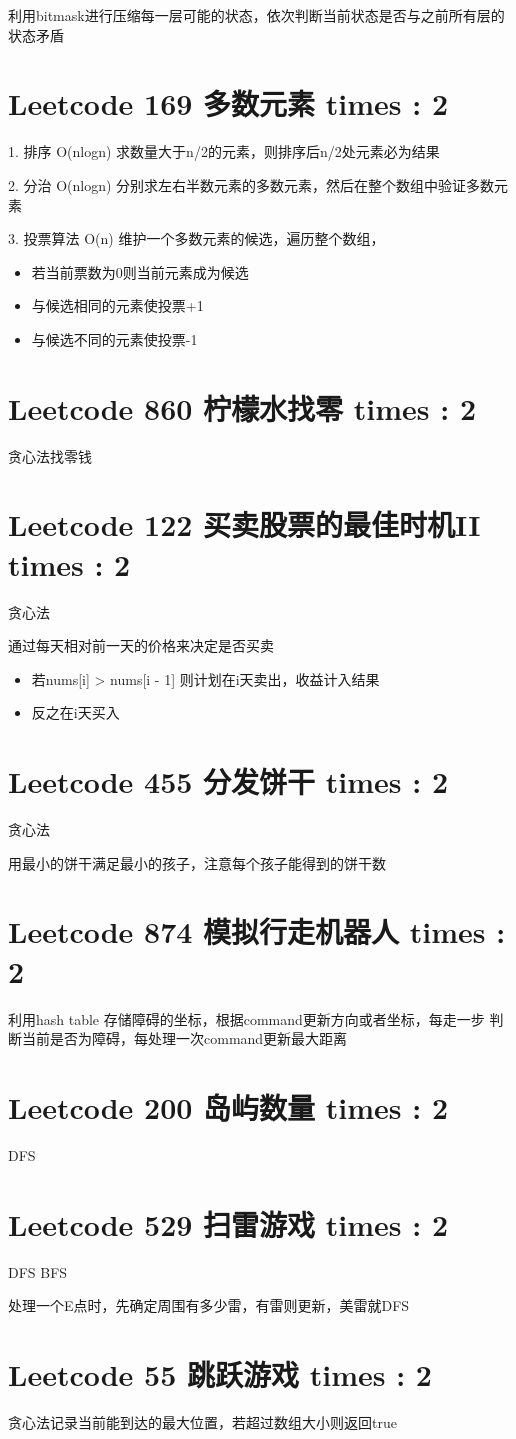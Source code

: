 \documentclass[UTF8]{ctexart}
\begin{document}
利用bitmask进行压缩每一层可能的状态，依次判断当前状态是否与之前所有层的状态矛盾

\section{Leetcode 169 多数元素 times : 2}
1. 排序 O(nlogn)
求数量大于n/2的元素，则排序后n/2处元素必为结果

2. 分治 O(nlogn)
分别求左右半数元素的多数元素，然后在整个数组中验证多数元素

3. 投票算法 O(n)
维护一个多数元素的候选，遍历整个数组，
\begin{itemize}
	\item 若当前票数为0则当前元素成为候选
	\item 与候选相同的元素使投票+1
	\item 与候选不同的元素使投票-1
\end{itemize}

\section{Leetcode 860 柠檬水找零 times : 2}
贪心法找零钱

\section{Leetcode 122 买卖股票的最佳时机II times : 2}
贪心法

通过每天相对前一天的价格来决定是否买卖
\begin{itemize}
	\item 若nums[i] > nums[i - 1] 则计划在i天卖出，收益计入结果
	\item 反之在i天买入
\end{itemize}

\section{Leetcode 455 分发饼干 times : 2}
贪心法

用最小的饼干满足最小的孩子，注意每个孩子能得到的饼干数

\section{Leetcode 874 模拟行走机器人 times : 2}
利用hash table 存储障碍的坐标，根据command更新方向或者坐标，每走一步
判断当前是否为障碍，每处理一次command更新最大距离

\section{Leetcode 200 岛屿数量 times : 2}
DFS

\section{Leetcode 529 扫雷游戏 times : 2}
DFS BFS

处理一个E点时，先确定周围有多少雷，有雷则更新，美雷就DFS

\section{Leetcode 55 跳跃游戏 times : 2}
贪心法记录当前能到达的最大位置，若超过数组大小则返回true
\end{document}
